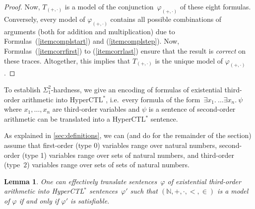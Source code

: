 \documentclass[dvipsnames,10pt,a4paper]{amsart}
\newtheorem{lem}[thm]{Lemma}
\theoremstyle{definition}
\theoremstyle{remark}
\newcommand{\nats}{\mathbb{N}}
\newcommand\Nat{\nats}
\newcommand{\hyctlstar}{{HyperCTL$^*$}\xspace}
\newcommand\phiop{\varphi_{({+},{\cdot})}}
\newcommand\Top{T_{({+},{\cdot})}}
\newcommand\xt{x}
\begin{document}
\begin{proof}
Now, $\Top$ is a model of the conjunction~$\phiop$ of these eight formulas. Conversely, every model of $\phiop$ contains all possible combinations of arguments (both for addition and multiplication) due to Formulas~(\ref{itemcomplstart}) and (\ref{itemcomplstep}).
Now, Formulas~(\ref{itemcorrfirst}) to (\ref{itemcorrlast}) ensure that the result is \emph{correct} on these traces. Altogether, this implies that $\Top$ is the unique model of $\phiop$.
\end{proof}

To establish $\Sigma_1^2$-hardness, we give an encoding of formulas of
existential third-order arithmetic into \hyctlstar, i.e.\ every formula of the form~$\exists \xt_1.\ \ldots \exists \xt_n.\ \psi$ where
  $\xt_1, \ldots, \xt_n$ are third-order variables
  and $\psi$ is a sentence of second-order arithmetic can be translated into a \hyctlstar sentence.

As explained in \autoref{sec:definitions}, we can (and do for the remainder
of the section) assume that first-order (type 0) variables range over natural
numbers,
second-order (type 1) variables range over sets of natural numbers,
and third-order (type~$2$) variables range over sets of sets of natural numbers.


\begin{lem}\label{lem:hyctlstar-reduction}
One can effectively translate sentences~$\varphi$ of existential third-order arithmetic into \hyctlstar sentences~$\varphi'$ such that
  $(\Nat, +, \cdot, <,\in)$ is a model of $\varphi$ if and only if
  $\varphi'$ is satisfiable.
\end{lem}
\end{document}
